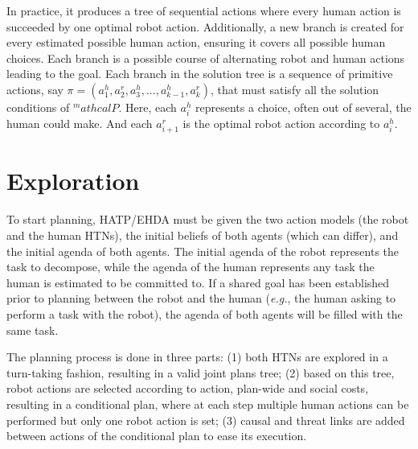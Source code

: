 In practice, it produces a tree of sequential actions where every human action is succeeded by one optimal robot action. Additionally, a new branch is created for every estimated possible human action, ensuring it covers all possible human choices. Each branch is a possible course of alternating robot and human actions leading to the goal.
Each branch in the solution tree is a sequence of primitive actions, say $\pi=(a_1^h,a_2^r,a_3^h,...,a_{k-1}^h,a_k^r)$, that must satisfy all the solution conditions of $^mathcal{P}$. 
Here, each $a_i^h$ represents a choice, often out of several, the human could make. And each $a_{i+1}^r$ is the optimal robot action according to $a_i^h$.


\section{Exploration}

To start planning, HATP/EHDA must be given the two action models (the robot and the human HTNs), the initial beliefs of both agents (which can differ), and the initial agenda of both agents. The initial agenda of the robot represents the task to decompose, while the agenda of the human represents any task the human is estimated to be committed to. If a shared goal has been established prior to planning between the robot and the human (\textit{e.g.}, the human asking to perform a task with the robot), the agenda of both agents will be filled with the same task.

The planning process is done in three parts: (1) both HTNs are explored in a turn-taking fashion, resulting in a valid joint plans tree; (2) based on this tree, robot actions are selected according to action, plan-wide and social costs, resulting in a conditional plan, where at each step multiple human actions can be performed but only one robot action is set; (3) causal and threat links are added between actions of the conditional plan to ease its execution.

